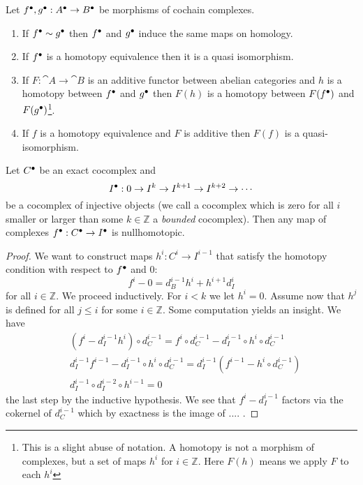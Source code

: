 \begin{exc}
	Let ${f}^\bullet, {g}^\bullet: {A}^\bullet \to {B}^\bullet$ be morphisms of cochain complexes. 
	\begin{enumerate}[label=(\alph*)]
    	\item If ${f}^\bullet \sim {g}^\bullet$ then ${f}^\bullet$ and ${g}^\bullet$ induce the same maps on homology. 
		\item If ${f}^\bullet$ is a homotopy equivalence then it is a quasi isomorphism.
		\item If $F: \cat A \to \cat B$ is an additive functor between abelian categories and $h$ is a homotopy between ${f}^\bullet$ and ${g}^\bullet$ then $F(h)$ is a homotopy between $F({f}^\bullet)$ and $F({g}^\bullet)$\footnote{This is a slight abuse of notation. A homotopy is not a morphism of complexes, but a set of maps $h^i$ for $i \in \mathbb{Z}$. Here $F(h)$ means we apply $F$ to each $h^i$}.
		\item If $f$ is a homotopy equivalence and $F$ is additive then $F(f)$ is a quasi-isomorphism. 
    \end{enumerate}
\end{exc}

\begin{lem}\label{lem:maps-from-exact-to-injective-nullhomotopic}
	Let ${C}^\bullet$ be an exact cocomplex and \[
    	{I}^\bullet: 0 \to I^k \to I^{k+1} \to I^{k+2} \to \cdots 
    \] be a cocomplex of injective objects (we call a cocomplex which is zero for all $i$ smaller or larger than some $k \in \mathbb{Z}$ a \emph{bounded} cocomplex). 
	Then any map of complexes ${f}^\bullet: {C}^\bullet \to {I}^\bullet$ is nullhomotopic. 
\end{lem}
\begin{proof}
	We want to construct maps $h^i: C^i \to I^{i-1}$ that satisfy the homotopy condition with respect to ${f}^\bullet$ and $0$: \[
    	f^i - 0 = d_B^{i-1}h^i + h^{i+1}d_I^i
    \] for all $i \in \mathbb{Z}$. We proceed inductively. For $i < k$ we let $h^i = 0$. Assume now that $h^j$ is defined for all $j \leq i$ for some $i \in \mathbb{Z}$. 
	Some computation yields an insight. We have 
	\begin{align*}
    	&(f^i - d_I^{i-1}h^i) \circ d_C^{i-1} = f^i \circ d_C^{i-1} - d_I ^{i-1} \circ h^i \circ d_C^{i-1}\\
		& d_I^{i-1}f^{i-1} - d_I^{i-1}\circ h^i \circ d_C^{i-1} = d_I^{i-1}(f^{i-1} - h^i \circ d_C^{i-1})\\
		& d^{i-1}_I \circ d_I^{i-2} \circ h^{i-1} = 0
    \end{align*} the last step by the inductive hypothesis. 
	We see that $f^i - d_I^{i-1}$ factors via the cokernel of $d_C^{i-1}$ which by exactness is the image of .... . 
\end{proof}

